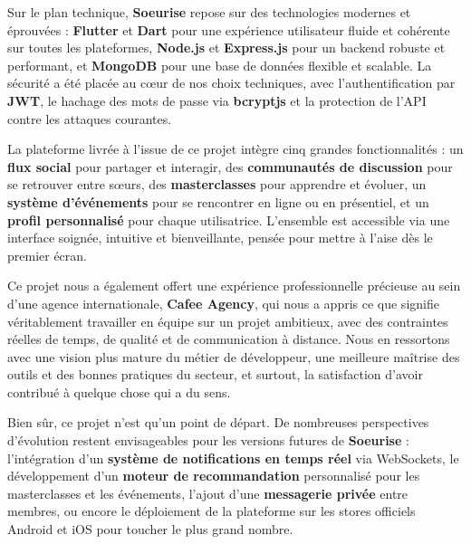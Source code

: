 \documentclass[12pt,a4paper]{report}
\begin{document}
	\medskip
	
	Sur le plan technique, \textbf{Soeurise} repose sur des technologies 
	modernes et éprouvées : \textbf{Flutter} et \textbf{Dart} pour une 
	expérience utilisateur fluide et cohérente sur toutes les plateformes, 
	\textbf{Node.js} et \textbf{Express.js} pour un backend robuste et 
	performant, et \textbf{MongoDB} pour une base de données flexible et 
	scalable. La sécurité a été placée au cœur de nos choix techniques, 
	avec l'authentification par \textbf{JWT}, le hachage des mots de passe 
	via \textbf{bcryptjs} et la protection de l'API contre les attaques 
	courantes.
	
	\medskip
	
	La plateforme livrée à l'issue de ce projet intègre cinq grandes 
	fonctionnalités : un \textbf{flux social} pour partager et interagir, 
	des \textbf{communautés de discussion} pour se retrouver entre sœurs, 
	des \textbf{masterclasses} pour apprendre et évoluer, un \textbf{système 
		d'événements} pour se rencontrer en ligne ou en présentiel, et un 
	\textbf{profil personnalisé} pour chaque utilisatrice. L'ensemble est 
	accessible via une interface soignée, intuitive et bienveillante, pensée 
	pour mettre à l'aise dès le premier écran.
	
	\medskip
	
	Ce projet nous a également offert une expérience professionnelle précieuse 
	au sein d'une agence internationale, \textbf{Cafee Agency}, qui nous a 
	appris ce que signifie véritablement travailler en équipe sur un projet 
	ambitieux, avec des contraintes réelles de temps, de qualité et de 
	communication à distance. Nous en ressortons avec une vision plus mature 
	du métier de développeur, une meilleure maîtrise des outils et des 
	bonnes pratiques du secteur, et surtout, la satisfaction d'avoir contribué 
	à quelque chose qui a du sens.
	
	\medskip
	
	Bien sûr, ce projet n'est qu'un point de départ. De nombreuses 
	perspectives d'évolution restent envisageables pour les versions 
	futures de \textbf{Soeurise} : l'intégration d'un \textbf{système de 
		notifications en temps réel} via WebSockets, le développement d'un 
	\textbf{moteur de recommandation} personnalisé pour les masterclasses 
	et les événements, l'ajout d'une \textbf{messagerie privée} entre 
	membres, ou encore le déploiement de la plateforme sur les stores 
	officiels Android et iOS pour toucher le plus grand nombre.
	
	\medskip
	
\end{document}

